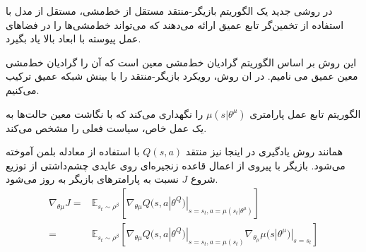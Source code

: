 در روشی جدید یک الگوریتم بازیگر-منتقد مستقل از خط‌مشی، مستقل از مدل
 با استفاده از تخمین‌گر تابع عمیق ارائه می‌دهند که می‌تواند خط‌مشی‌ها را در فضاهای عمل پیوسته با ابعاد بالا یاد بگیرد.

این روش بر اساس الگوریتم گرادیان خط‌مشی معین
است که آن را
گرادیان خط‌مشی معین عمیق
می نامیم. 
 در ان روش، رویکرد بازیگر-منتقد را با بینش شبکه  عمیق
   ترکیب می‌کنیم.
   
   
الگوریتم 
 تابع عمل پارامتری
$
	\mu (s|\theta^\mu)	
$
  را نگهداری می‌کند که با نگاشت معین حالت‌ها به یک عمل خاص، سیاست فعلی را مشخص می‌کند.

همانند روش یادگیری 
در اینجا نیز منتقد
$Q(s,a)$
 با استفاده از معادله بلمن آموخته می‌شود.
 بازیگر با پیروی از اعمال قاعده زنجیره‌ای روی عایدی چشم‌داشتی از توزیع شروع
 $J$
  نسبت به پارامترهای بازیگر به روز می‌شود.
\begin{align}
	\nabla_{\theta \mu} J = & \mathbb{E}_{s_t \sim \rho ^{ \beta}} [ \nabla_{\theta \mu} Q(s,a|\theta^Q)|_{s=s_t,a=\mu (s_t|\theta^{\mu})}  ] \\ \nonumber
	= & \mathbb{E}_{s_t \sim \rho ^{ \beta}} [ \nabla_{\theta \mu} Q(s,a|\theta^Q)|_{s=s_t, a=\mu (s_t)} \nabla_{\theta_{\mu}} \mu (s|\theta^{\mu})|_{s=s_t} ]
\end{align}

